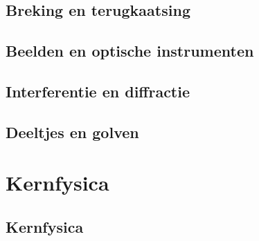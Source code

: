 \documentclass[12pt]{report}
\begin{document}
\chapter{Breking en terugkaatsing}

\chapter{Beelden en optische instrumenten}

\chapter{Interferentie en diffractie}

\chapter{Deeltjes en golven}

\part{Kernfysica}
\chapter{Kernfysica}
\end{document}

